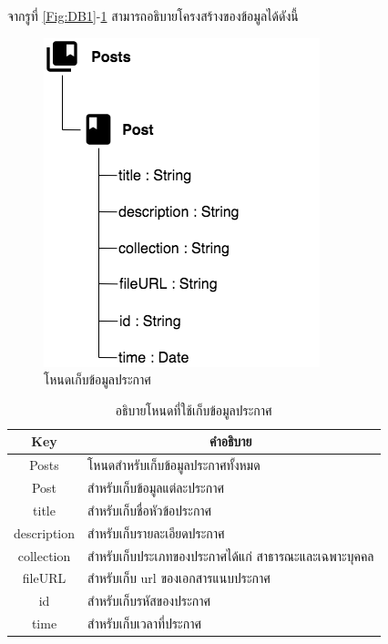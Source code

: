 \newpage
จากรูที่ \ref{Fig:DB1}-\ref{Fig:DB4} สามารถอธิบายโครงสร้างของข้อมูลได้ดังนี้
\begin{figure}[H]
\centering
\includegraphics[width=0.5\columnwidth]
{Figures/3/DB/nodePost}
\caption{โหนดเก็บข้อมูลประกาศ}
\label{Fig:DB4}
\end{figure}
\begin{table}[H]
	\centering
	\caption{อธิบายโหนดที่ใช้เก็บข้อมูลประกาศ}
	\label{my-label1}
	\begin{tabular}{|c|p{10cm}|}
		\hline
		\multicolumn{1}{|c|}{\textbf{Key}} & \multicolumn{1}{c|}{\textbf{คำอธิบาย}} \\ \hline
		Posts & โหนดสำหรับเก็บข้อมูลประกาศทั้งหมด \\ \hline
		Post &  สำหรับเก็บข้อมูลแต่ละประกาศ \\ \hline
		title & สำหรับเก็บชื่อหัวข้อประกาศ \\ \hline
		description & สำหรับเก็บรายละเอียดประกาศ  \\ \hline
		collection & สำหรับเก็บประเภทของประกาศได้แก่ สาธารณะและเฉพาะบุคคล \\ \hline
		fileURL & สำหรับเก็บ url ของเอกสารแนบประกาศ \\ \hline
		id & สำหรับเก็บรหัสของประกาศ \\ \hline
		time & สำหรับเก็บเวลาที่ประกาศ \\ \hline
	\end{tabular}
\end{table}

